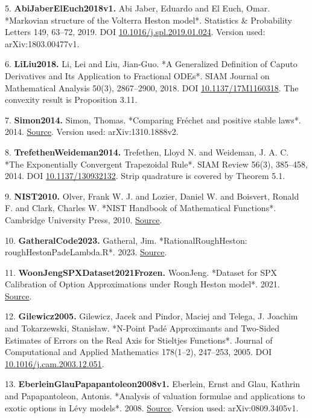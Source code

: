 \documentclass[a4paper,11pt]{article}
\begin{document}
5. \textbf{AbiJaberElEuch2018v1.} Abi Jaber, Eduardo and El Euch, Omar. *Markovian structure of the Volterra Heston model*. Statistics \& Probability Letters 149, 63–72, 2019. DOI \href{https://doi.org/10.1016/j.spl.2019.01.024}{10.1016/j.spl.2019.01.024}. Version used: arXiv:1803.00477v1.

6. \textbf{LiLiu2018.} Li, Lei and Liu, Jian-Guo. *A Generalized Definition of Caputo Derivatives and Its Application to Fractional ODEs*. SIAM Journal on Mathematical Analysis 50(3), 2867–2900, 2018. DOI \href{https://doi.org/10.1137/17M1160318}{10.1137/17M1160318}. The convexity result is Proposition 3.11.

7. \textbf{Simon2014.} Simon, Thomas. *Comparing Fréchet and positive stable laws*. 2014. \href{https://arxiv.org/abs/1310.1888v2}{Source}. Version used: arXiv:1310.1888v2.

8. \textbf{TrefethenWeideman2014.} Trefethen, Lloyd N. and Weideman, J. A. C. *The Exponentially Convergent Trapezoidal Rule*. SIAM Review 56(3), 385–458, 2014. DOI \href{https://doi.org/10.1137/130932132}{10.1137/130932132}. Strip quadrature is covered by Theorem 5.1.

9. \textbf{NIST2010.} Olver, Frank W. J. and Lozier, Daniel W. and Boisvert, Ronald F. and Clark, Charles W. *NIST Handbook of Mathematical Functions*. Cambridge University Press, 2010. \href{https://dlmf.nist.gov/}{Source}.

10. \textbf{GatheralCode2023.} Gatheral, Jim. *RationalRoughHeston: roughHestonPadeLambda.R*. 2023. \href{https://github.com/jgatheral/RationalRoughHeston/blob/d65ea96e4c113fbb330074dfaea3e7715d650bbd/roughHestonPadeLambda.R}{Source}.

11. \textbf{WoonJengSPXDataset2021Frozen.} WoonJeng. *Dataset for SPX Calibration of Option Approximations under Rough Heston model*. 2021. \href{https://github.com/WoonJeng/Dataset-for-SPX-Calibration-of-Option-Approximations-under-Rough-Heston-model/tree/860049da2b7486fe8aa509061eff23cc28c2ef89}{Source}.

12. \textbf{Gilewicz2005.} Gilewicz, Jacek and Pindor, Maciej and Telega, J. Joachim and Tokarzewski, Stanisław. *N-Point Padé Approximants and Two-Sided Estimates of Errors on the Real Axis for Stieltjes Functions*. Journal of Computational and Applied Mathematics 178(1–2), 247–253, 2005. DOI \href{https://doi.org/10.1016/j.cam.2003.12.051}{10.1016/j.cam.2003.12.051}.

13. \textbf{EberleinGlauPapapantoleon2008v1.} Eberlein, Ernst and Glau, Kathrin and Papapantoleon, Antonis. *Analysis of valuation formulae and applications to exotic options in Lévy models*. 2008. \href{https://arxiv.org/abs/0809.3405v1}{Source}. Version used: arXiv:0809.3405v1.
\end{document}
